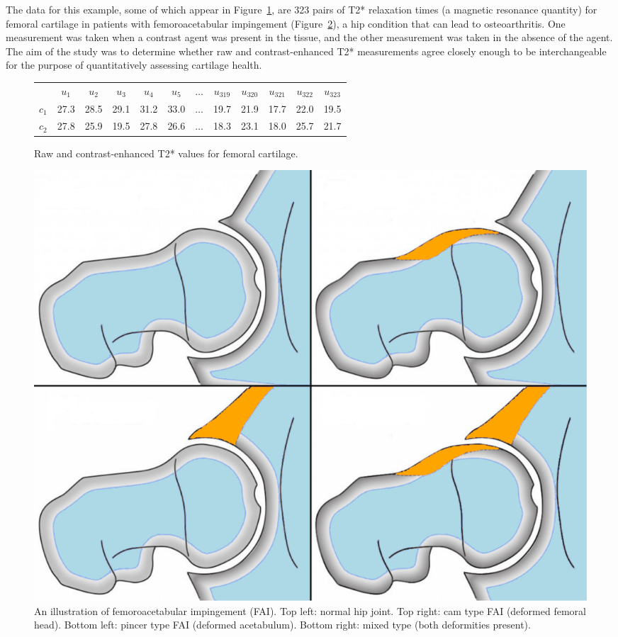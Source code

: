 The data for this example, some of which appear in Figure~\ref{fig:interval}, are 323 pairs of T2* relaxation times (a magnetic resonance quantity) for femoral cartilage \citep{nissi2015t2} in patients with femoroacetabular impingement (Figure~\ref{fig:fai}), a hip condition that can lead to osteoarthritis. One measurement was taken when a contrast agent was present in the tissue, and the other measurement was taken in the absence of the agent. The aim of the study was to determine whether raw and contrast-enhanced T2* measurements agree closely enough to be interchangeable for the purpose of quantitatively assessing cartilage health.

\begin{figure}[h]
   \centering
   \begin{tabular}{cccccccccccc}
   & $u_1$ &  $u_2$ & $u_3$ & $u_4$ & $u_5$ & $\dots$ & $u_{319}$ & $u_{320}$ & $u_{321}$ & $u_{322}$ & $u_{323}$\vspace{2ex}\\
   $c_1$ & 27.3 & 28.5 & 29.1 & 31.2 & 33.0 & $\dots$ & 19.7 & 21.9 & 17.7 & 22.0 & 19.5\\
   $c_2$ & 27.8 & 25.9 & 19.5 & 27.8 & 26.6 & $\dots$ & 18.3 & 23.1 & 18.0 & 25.7 & 21.7
   \end{tabular}
   \caption{Raw and contrast-enhanced T2* values for femoral cartilage.}
   \label{fig:interval}
\end{figure}

\begin{figure}[h]
   \centering
   \includegraphics[scale=.3]{fai}
   \caption{An illustration of femoroacetabular impingement (FAI). Top left: normal hip joint. Top right: cam type FAI (deformed femoral head). Bottom left: pincer type FAI (deformed acetabulum). Bottom right: mixed type (both deformities present).}
   \label{fig:fai}
\end{figure}

